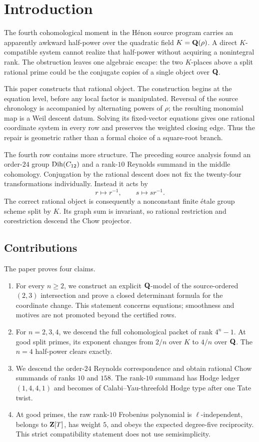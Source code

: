 \section{Introduction}

The fourth cohomological moment in the H\'enon source program carries an
apparently awkward half-power over the quadratic field
\(K=\mathbf Q(\rho)\).  A direct \(K\)-compatible system cannot realize that
half-power without acquiring a nonintegral rank.  The obstruction leaves
one algebraic escape: the two \(K\)-places above a split rational prime
could be the conjugate copies of a single object over \(\mathbf Q\).

This paper constructs that rational object.  The construction begins at the
equation level, before any local factor is manipulated.  Reversal of the
source chronology is accompanied by alternating powers of \(\rho\); the
resulting monomial map is a Weil descent datum.  Solving its fixed-vector
equations gives one rational coordinate system in every row and preserves
the weighted closing edge.  Thus the repair is geometric rather than a
formal choice of a square-root branch.

The fourth row contains more structure.  The preceding source analysis
found an order-\(24\) group
\(\operatorname{Dih}(C_{12})\) and a rank-\(10\) Reynolds summand in the middle
cohomology.  Conjugation by the rational descent does not fix the
twenty-four transformations individually.  Instead it acts by
\[
r\longmapsto r^{-1},\qquad s\longmapsto sr^{-1}.
\]
The correct rational object is consequently a nonconstant finite \'etale
group scheme split by \(K\).  Its graph sum is invariant, so rational
restriction and corestriction descend the Chow projector.

\subsection*{Contributions}

The paper proves four claims.

\begin{enumerate}[leftmargin=*]
\item For every \(n\ge2\), we construct an explicit \(\mathbf Q\)-model of the
source-ordered \((2,3)\) intersection and prove a closed determinant
formula for the coordinate change.  This statement concerns equations;
smoothness and motives are not promoted beyond the certified rows.
\item For \(n=2,3,4\), we descend the full cohomological packet of rank
\(4^n-1\).  At good split primes, its exponent changes from \(2/n\) over
\(K\) to \(4/n\) over \(\mathbf Q\).  The \(n=4\) half-power clears exactly.
\item We descend the order-\(24\) Reynolds correspondence and obtain
rational Chow summands of ranks \(10\) and \(158\).  The rank-\(10\)
summand has Hodge ledger \((1,4,4,1)\) and becomes of
Calabi--Yau-threefold Hodge type after one Tate twist.
\item At good primes, the raw rank-\(10\) Frobenius polynomial is
\(\ell\)-independent, belongs to \(\mathbf Z[T]\), has weight \(5\), and obeys
the expected degree-five reciprocity.  This strict compatibility statement
does not use semisimplicity.
\end{enumerate}

